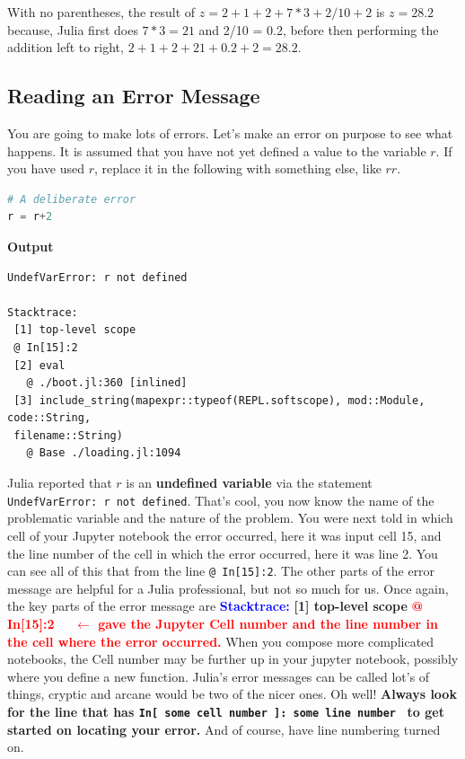 \begin{rem} With no parentheses, the result of $z = 2 + 1 + 2 + 7 * 3 + 2 / 10 + 2$ is $z=28.2$ because, Julia first does $7 *3=21$ and 2/10 = 0.2, before then performing the addition left to right,  $2 + 1 + 2  + 21 + 0.2 + 2= 28.2.$
\end{rem}



\subsection{Reading an Error Message}

You are going to make lots of errors. Let's make an error on purpose to see what happens. It is assumed that you have not yet defined a value to the variable $r$. If you have used $r$, replace it in the following with something else, like $rr$.

\begin{lstlisting}[language=Julia,style=mystyle]
# A deliberate error
r = r+2
\end{lstlisting}
\textbf{Output} 
\begin{verbatim}
UndefVarError: r not defined

Stacktrace:
 [1] top-level scope
 @ In[15]:2
 [2] eval
   @ ./boot.jl:360 [inlined]
 [3] include_string(mapexpr::typeof(REPL.softscope), mod::Module, code::String,
 filename::String)
   @ Base ./loading.jl:1094
\end{verbatim}

Julia reported that $r$ is an \textbf{undefined variable} via the statement \texttt{UndefVarError: r not defined}. That's cool, you now know the name of the problematic variable and the nature of the problem. You were next told in which cell of your Jupyter notebook the error occurred, here it was input cell 15, and the line number of the cell in which the error occurred, here it was line 2. You can see all of this that from the line \texttt{@ In[15]:2}. The other parts of the error message are helpful for a Julia professional, but not so much for us. Once again, the key parts of the error message are \newline
\textcolor{blue}{\bf Stacktrace:}\newline
 \textbf{[1] top-level scope} \newline
\textcolor{red}{\bf @ In[15]:2 ~~$\leftarrow$ gave the Jupyter Cell number and the line number in the cell where the error occurred.} When you compose more complicated notebooks, the Cell number may be further up in your jupyter notebook, possibly where you define a new function. Julia's error messages can be called lot's of things, cryptic and arcane would be two of the nicer ones. Oh well! \textbf{Always look for the line that has \texttt{In[ some cell number ]: some line number } to get started on locating your error.} And of course, have line numbering turned on.



